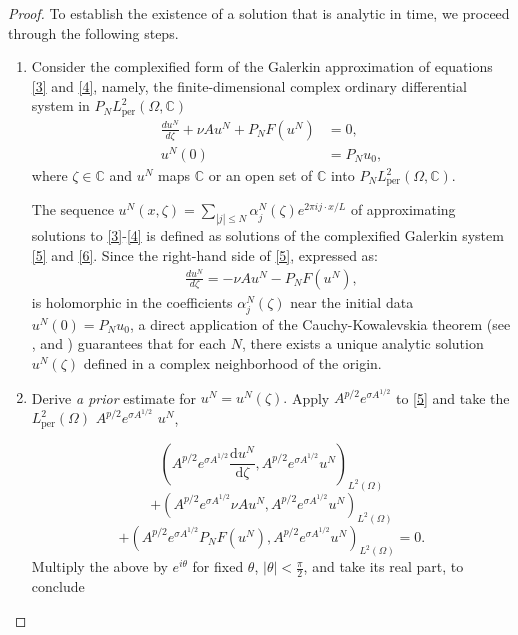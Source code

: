 \documentclass[12pt]{article}
\theoremstyle{plain}
\theoremstyle{remark}
\newcommand{\dd}{\mathrm{d}}
\begin{document}
\begin{proof} 
To establish the existence of a solution that is analytic in time, we proceed through the following steps. 
\begin{enumerate}
    
\item Consider the complexified form of the Galerkin approximation of equations \eqref{3} and \eqref{4}, namely, the finite-dimensional complex ordinary differential  system in $P_N L_\text{per}^2(\Omega,\mathbb{C})$  
\begin{align}
\frac{du^N}{d \zeta} + \nu A u^N + P_N F(u^N) &= 0, \label{5}\\
u^N( 0) &= P_N u_0,\label{6}
\end{align}
where $\zeta \in \mathbb{C}$ and $u^N$ maps $\mathbb{C}$ or an open set of $\mathbb{C}$ into $P_N L_\text{per}^2(\Omega,\mathbb{C})$.

The sequence $
u^N(x, \zeta) = \sum_{ |j| \leq N} \alpha_j^N(\zeta)  e^{2\pi i j \cdot x / L}$  of approximating solutions to \eqref{3}-\eqref{4} is defined as solutions of the complexified Galerkin system \eqref{5} and \eqref{6}. Since the right-hand side of \eqref{5}, expressed as:
\begin{align*}
    \frac{du^N}{d \zeta} =- \nu A u^N - P_N F(u^N) ,
\end{align*}  
is holomorphic in the coefficients $\alpha_j^N(\zeta)$ near the initial data $u^N(0)=P_Nu_0$, a direct application of the  Cauchy-Kowalevskia theorem (see \cite{FollandPDE}, \cite{Tsogtgerel2014} and   \cite{hille1976ordinary} ) guarantees that for each $N$, there exists a unique analytic solution $u^N(\zeta)$ defined in a complex neighborhood of the origin.

 \item Derive \textit{a prior} estimate for \( u^N=u^N(\zeta) .\) Apply \( A^{p/2} e^{\sigma A^{1/2}} \) to \eqref{5} and take the  $L_\text{per}^2 (\Omega)$  \( A^{p/2} e^{\sigma A^{1/2}} \) $u^N$,   

\[
\left( A^{p/2} e^{\sigma A^{1/2}} \frac{\dd u^N}{\dd\zeta} , A^{p/2} e^{\sigma A^{1/2}} u^N\right)_ {L^2(\Omega)}
\]
\[
+ \left( A^{p/2} e^{\sigma A^{1/2}}\nu  Au^N, A^{p/2} e^{\sigma A^{1/2}} u^N \right)_ {L^2(\Omega)}
\]
\[
+ \left( A^{p/2} e^{\sigma A^{1/2}} P_N F(u^N), A^{p/2} e^{\sigma A^{1/2}} u^N \right)_ {L^2(\Omega)}= 0.
\]
Multiply the above by $e^{i\theta}$ for fixed \(\theta\), \(|\theta| < \frac{\pi}{2}\), and take its real part, to conclude


\end{enumerate}
\end{proof}
\end{document}
